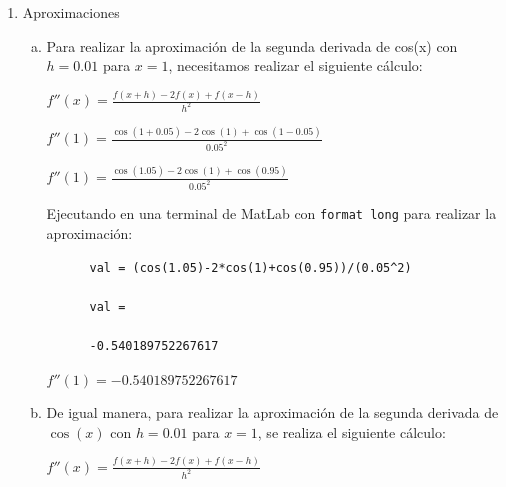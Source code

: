 \documentclass[english,notitlepage,letterpaper, 10pt]{article} %
\begin{document}
\begin{enumerate}
  \item Aproximaciones

  \begin{enumerate}[a)] 
    \item Para realizar la aproximación de la segunda derivada de cos(x) con $h=0.01$ para $x=1$, necesitamos realizar el siguiente cálculo:  
    
    
    \begin{center}  
      \begin{math}  
        f''(x) = \displaystyle \frac{f(x+h)-2f(x)+f(x-h)}{h^2}  
      \end{math}  
      
      \begin{math}  
        f''(1) = \displaystyle \frac{\cos(1+0.05)-2\cos(1)+\cos(1-0.05)}{0.05^2}  
      \end{math}  
      
      \begin{math}  
        f''(1) = \displaystyle \frac{\cos(1.05)-2\cos(1)+\cos(0.95)}{0.05^2}  
      \end{math}  
    \end{center}  
    
    Ejecutando en una terminal de MatLab con \texttt{format long} para realizar la aproximación:  
    
    \begin{lstlisting}  
      val = (cos(1.05)-2*cos(1)+cos(0.95))/(0.05^2) 
      
      val =       
      
      -0.540189752267617  
    \end{lstlisting}  
    
    \begin{center}  
      \begin{math}  
        f''(1) = -0.540189752267617 
      \end{math}  
    \end{center}  
    
    \item De igual manera, para realizar la aproximación de la segunda derivada de $\cos(x)$ con $h=0.01$ para $x=1$, se realiza el siguiente cálculo:  
    
    \begin{center}  
      \begin{math}  
        f''(x) = \displaystyle \frac{f(x+h)-2f(x)+f(x-h)}{h^2}  
      \end{math}  
      

\end{center}
\end{enumerate}
\end{enumerate}
\end{document}
